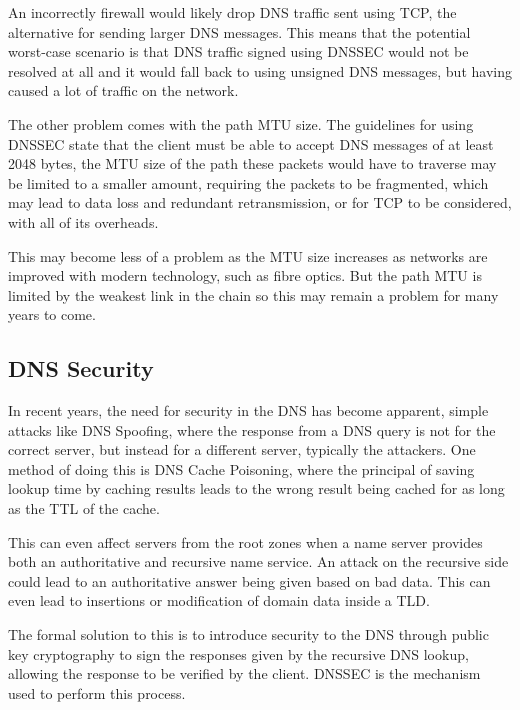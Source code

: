\documentclass[11pt, a4paper]{article}
\begin{document}
An incorrectly firewall would likely drop \gls{DNS} traffic sent using
\gls{TCP}, the alternative for sending larger \gls{DNS} messages. This means
that the potential worst-case scenario is that \gls{DNS} traffic signed using
\gls{DNSSEC} would not be resolved at all and it would fall back to using 
unsigned \gls{DNS} messages, but having caused a lot of traffic on the network.


The other problem comes with the path \gls{MTU} size. The guidelines for using
\gls{DNSSEC} state that the client must be able to accept \gls{DNS} messages of
at least 2048 bytes, the \gls{MTU} size of the path these packets would have to
traverse may be limited to a smaller amount, requiring the packets to be 
fragmented, which may lead to data loss and redundant retransmission, or for 
\gls{TCP} to be considered, with all of its overheads.

This may become less of a problem as the \gls{MTU} size increases as networks
are improved with modern technology, such as fibre optics. But the path 
\gls{MTU} is limited by the weakest link in the chain so this may remain a
problem for many years to come.

\subsection{DNS Security}
\label{subsec:dnssec}
In recent years, the need for security in the \gls{DNS} has become apparent, 
simple attacks like \gls{DNS} Spoofing, where the response from a \gls{DNS}
query is not for the correct server, but instead for a different server, 
typically the attackers. One method of doing this is \gls{DNS} Cache 
Poisoning\cite{davies2008cache}, where the principal of saving lookup time by
caching results leads to the wrong result being cached for as long as the 
\gls{TTL} of the cache. 

This can even affect servers from the root zones when a name server provides 
both an authoritative and recursive name service. An attack on the recursive
side could lead to an authoritative answer being given based on bad data. This
can even lead to insertions or modification of domain data inside a \gls{TLD}.

The formal solution to this is to introduce security to the \gls{DNS} through
public key cryptography to sign the responses given by the recursive \gls{DNS}
lookup, allowing the response to be verified by the client. \Gls{DNSSEC} is the
mechanism used to perform this process.
\end{document}
